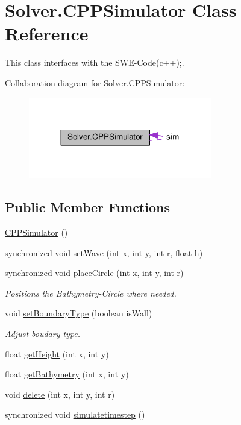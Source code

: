 \hypertarget{classSolver_1_1CPPSimulator}{}\section{Solver.\+C\+P\+P\+Simulator Class Reference}
\label{classSolver_1_1CPPSimulator}


This class interfaces with the S\+W\+E-\/\+Code(c++);.  




Collaboration diagram for Solver.\+C\+P\+P\+Simulator\+:\nopagebreak
\begin{figure}[H]
\begin{center}
\leavevmode
\includegraphics[width=227pt]{classSolver_1_1CPPSimulator__coll__graph}
\end{center}
\end{figure}
\subsection*{Public Member Functions}
\begin{DoxyCompactItemize}
\item 
\hyperlink{classSolver_1_1CPPSimulator_a61c07ab42d950c18faf07de9a7e1ad78}{C\+P\+P\+Simulator} ()
\item 
synchronized void \hyperlink{classSolver_1_1CPPSimulator_a6a9b3b5c6f3d51454f08544a75c50f07}{set\+Wave} (int x, int y, int r, float h)
\item 
synchronized void \hyperlink{classSolver_1_1CPPSimulator_a5c5c02b860f5e7d5e9b5a35c69a6afa5}{place\+Circle} (int x, int y, int r)
\begin{DoxyCompactList}\small\item\em Positions the Bathymetry-\/\+Circle where needed. \end{DoxyCompactList}\item 
void \hyperlink{classSolver_1_1CPPSimulator_a2dee5bb6579454cd905da99a481715ad}{set\+Boundary\+Type} (boolean is\+Wall)
\begin{DoxyCompactList}\small\item\em Adjust boudary-\/type. \end{DoxyCompactList}\item 
float \hyperlink{classSolver_1_1CPPSimulator_accb69ced833a0389208151e1e656f42f}{get\+Height} (int x, int y)
\item 
float \hyperlink{classSolver_1_1CPPSimulator_a51731517dfc635e18ca47077f191792d}{get\+Bathymetry} (int x, int y)
\item 
void \hyperlink{classSolver_1_1CPPSimulator_a3391b22f04a1e29bedb7e0bb003fce45}{delete} (int x, int y, int r)
\item 
synchronized void \hyperlink{classSolver_1_1CPPSimulator_a79cb0bb6f02756a83b04651d896ca42d}{simulatetimestep} ()
\end{DoxyCompactItemize}
